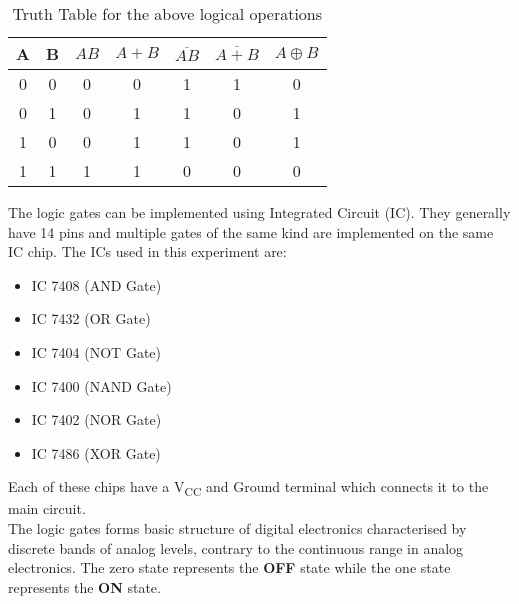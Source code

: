 \documentclass{scrartcl}
\begin{document}
\begin{table}[H]
    \centering
    \label{tab:truth_table}
    \renewcommand{\arraystretch}{1.5} %
    \begin{tabular}{|c|c||c|c|c|c|c|}
    \hline
    \textbf{A} & \textbf{B} & {$AB$} & {$A + B$} & {$\overline{AB}$} & {$\overline{A+B}$} & {$A \oplus B$} \\
    \hline
    0 & 0 & 0 & 0 & 1 & 1 & 0 \\
    0 & 1 & 0 & 1 & 1 & 0 & 1 \\
    1 & 0 & 0 & 1 & 1 & 0 & 1 \\
    1 & 1 & 1 & 1 & 0 & 0 & 0 \\
    \hline
    \end{tabular}
    \renewcommand{\arraystretch}{1} %
    \caption{Truth Table for the above logical operations}
\end{table}
The logic gates can be implemented using Integrated Circuit (IC). They generally have 14 pins and multiple gates of the same kind are implemented on the same IC chip. The ICs used in this experiment are:
\begin{itemize}
    \item  IC 7408 (AND Gate)
    \item IC 7432 (OR Gate)
    \item IC 7404 (NOT Gate)
    \item IC 7400 (NAND Gate)
    \item IC 7402 (NOR Gate)
    \item IC 7486 (XOR Gate)

\end{itemize}
 Each of these chips have a V\textsubscript{CC} and Ground terminal which connects it to the main circuit. \\[0.3cm]
 The logic gates forms basic structure of digital electronics characterised by discrete bands of analog levels, contrary to the continuous range in analog electronics. The zero state represents the \textbf{OFF} state while the one state represents the \textbf{ON} state. 
 
\end{document}
